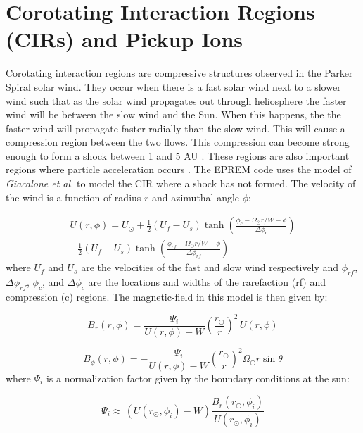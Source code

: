 \documentclass[%
 reprint,
 amsmath,amssymb,
 aps,
]{revtex4-1}
\begin{document}
\section{Corotating Interaction Regions (CIRs) and Pickup Ions}
Corotating interaction regions are compressive structures observed in the Parker Spiral solar wind. They occur when there is a fast solar wind next to a slower wind such that as the solar wind propagates out through heliosphere the faster wind will be between the slow wind and the Sun. When this happens, the the faster wind will propagate faster radially than the slow wind. This will cause a compression region between the two flows. This compression can become strong enough to form a shock between 1 and 5 AU \cite{cirshocks}. These regions are also important regions where particle acceleration occurs \cite{ciraccel} \cite{Giacalone2002}. The EPREM code uses the model of \textit{Giacalone et al.} \cite{Giacalone2002} to model the CIR where a shock has not formed. The velocity of the wind is a function of radius $r$ and azimuthal angle $\phi$:

\begin{equation*}
\begin{multlined}
U(r, \phi) = U_{\odot} + \frac{1}{2} (U_f - U_s) \tanh \left( \frac{\phi_c - \Omega_{\odot} r / W - \phi}{\Delta \phi_c} \right) \\- \frac{1}{2} (U_f - U_s) \tanh \left( \frac{\phi_{rf} - \Omega_{\odot} r / W - \phi}{\Delta \phi_{rf}} \right)
\end{multlined}
\end{equation*}
where $U_f$ and $U_s$ are the velocities of the fast and slow wind respectively and $\phi_{rf}$, $\Delta \phi_{rf}$, $\phi_c$, and $\Delta \phi_c$ are the locations and widths of the rarefaction (rf) and compression (c) regions. The magnetic-field in this model is then given by:

\begin{equation}
B_r(r, \phi) = \frac{\Psi_i}{U(r, \phi) - W} \left( \frac{r_{\odot}}{r} \right)^2 \, U(r, \phi)
\end{equation}

\begin{equation}
B_{\phi} (r, \phi) = - \frac{\Psi_i}{U(r, \phi) - W} \left( \frac{r_{\odot}}{r} \right)^2 \Omega_{\odot} r \sin \theta
\end{equation}
where $\Psi_i$ is a normalization factor given by the boundary conditions at the sun:

\begin{equation}
\Psi_i \approx \, (U(r_{\odot}, \phi_i) - W) \frac{B_r (r_{\odot}, \phi_i)}{U(r_{\odot}, \phi_i)}
\end{equation} 
\end{document}
